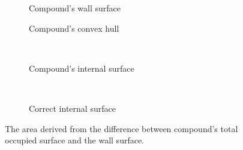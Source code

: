             \begin{wrapfigure}{l}{0.4\textwidth}
                \centering

                \begin{subfigure}[b]{.33\textwidth}
                    \centering
                    \begin{tikzpicture}[x=1mm,y=1mm,scale=0.041]
                         
                    \end{tikzpicture}
                    \caption{Compound's wall surface}
                    \label{fig:comp-wall}
                \end{subfigure}

                \vspace{0.02\textheight}

                \begin{subfigure}[b]{.33\textwidth}
                    \centering
                    \begin{tikzpicture}[x=1mm,y=1mm,scale=0.17]
                         
                    \end{tikzpicture}
                    \caption{Compound's convex hull}
                    \label{fig:comp-hull}
                \end{subfigure}\hfill\\

                \vspace{0.02\textheight}

                \begin{subfigure}[b]{.33\textwidth}
                    \centering
                    \begin{tikzpicture}[x=1mm,y=1mm,scale=0.045]
                         
                    \end{tikzpicture}
                    \caption{Compound's internal surface}
                    \label{fig:comp-area}
                \end{subfigure}\hfill\\

                \vspace{0.02\textheight}

                \begin{subfigure}[b]{.33\textwidth}
                    \centering
                    \begin{tikzpicture}[x=1mm,y=1mm,scale=0.07]
                         
                    \end{tikzpicture}
                    \caption{Correct internal surface}
                    \label{fig:comp-ang-area}
                \end{subfigure}

                \caption[Deriving compound area from difference between total occupied surface and wall surface]{The area derived from the difference between compound's total occupied surface and the wall surface.}
                \label{fig:comp}

                \vspace{-0.07\textheight}
            \end{wrapfigure}

